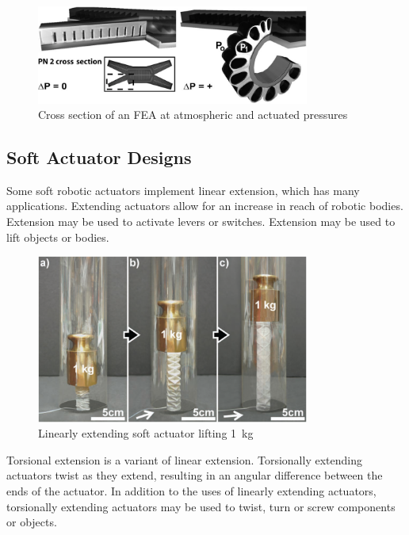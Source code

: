 \begin{figure}[H]
	\centering
	\includegraphics[width=0.8\textwidth]{FEA.png}
	\caption{Cross section of an FEA at atmospheric and actuated pressures \citep{Shepherd2011}}
	\label{fig:fea}
\end{figure}

\subsection{Soft Actuator Designs}

Some soft robotic actuators implement linear extension, which has many applications. Extending actuators allow for an increase in reach of robotic bodies. Extension may be used to activate levers or switches. Extension may be used to lift objects or bodies. \citep{Martinez2012}

\begin{figure}[H]
	\centering
	\includegraphics[width=0.8\textwidth]{LinearExtension.png}
	\caption{Linearly extending soft actuator lifting \SI{1}{kg} \citep{Martinez2012}}
	\label{fig:lea}
\end{figure}

Torsional extension is a variant of linear extension. Torsionally extending actuators twist as they extend, resulting in an angular difference between the ends of the actuator. In addition to the uses of linearly extending actuators, torsionally extending actuators may be used to twist, turn or screw components or objects. \citep{Yan2018}

